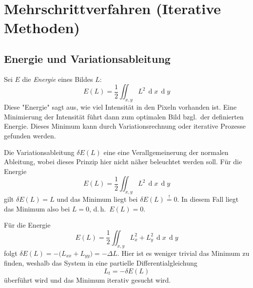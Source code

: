 \documentclass[a4paper, 11pt, accentcolor = tud3b]{tudreport}
\DeclareMathOperator{\total}{d}
\newcommand{\dif}[1]{\,\total#1}
\renewcommand{\dh}{d.\,h.~}
\newcommand{\bzgl}{bzgl.~}
\begin{document}
		\section{Mehrschrittverfahren (Iterative Methoden)}
			\subsection{Energie und Variationsableitung}
				Sei \(E\) die \emph{Energie} eines Bildes \(L\):
				\begin{equation*}
					E(L) = \frac{1}{2} \iint_{x, y} \! L^2 \dif{x} \dif{y}
				\end{equation*}
				Diese "Energie" sagt aus, wie viel Intensität in den Pixeln vorhanden ist. Eine Minimierung der Intensität führt dann zum optimalen Bild \bzgl der definierten Energie. Dieses Minimum kann durch Variationsrechnung oder iterative Prozesse gefunden werden.
			
				Die Variationsableitung \( \delta E(L) \) eine eine Verallgemeinerung der normalen Ableitung, wobei dieses Prinzip hier nicht näher beleuchtet werden soll. Für die Energie
				\begin{equation*}
					E(L) = \frac{1}{2} \iint_{x, y} \! L^2 \dif{x} \dif{y}
				\end{equation*}
				gilt \( \delta E(L) = L \) und das Minimum liegt bei \( \delta E(L) \overset{!}{=} 0 \). In diesem Fall liegt das Minimum also bei \( L = 0 \), \dh \( E(L) = 0 \).
				
				Für die Energie
				\begin{equation*}
					E(L) = \frac{1}{2} \iint_{x, y} \! L_x^2 + L_y^2 \dif{x} \dif{y}
				\end{equation*}
				folgt \( \delta E(L) = -\big( L_{xx} + L_{yy} \big) = -\Delta L \). Hier ist es weniger trivial das Minimum zu finden, weshalb das System in eine partielle Differentialgleichung
				\begin{equation*}
					L_t = -\delta E(L)
				\end{equation*}
				überführt wird und das Minimum iterativ gesucht wird.
\end{document}
